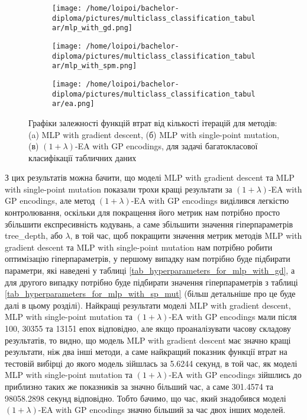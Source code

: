 \begin{figure}[ht]
	\centering
	\begin{subfigure}[b]{0.32\textwidth}    
		\texttt{[image: /home/loipoi/bachelor-diploma/pictures/multiclass\_classification\_tabular/mlp\_with\_gd.png]}
		\caption{}
	\end{subfigure}	
	\begin{subfigure}[b]{0.32\textwidth}
		\texttt{[image: /home/loipoi/bachelor-diploma/pictures/multiclass\_classification\_tabular/mlp\_with\_spm.png]}
		\caption{}
	\end{subfigure}	
	\begin{subfigure}[b]{0.32\textwidth}
		\texttt{[image: /home/loipoi/bachelor-diploma/pictures/multiclass\_classification\_tabular/ea.png]}
		\caption{}
	\end{subfigure}
	
	\caption{Графіки залежності функцій втрат від кількості ітерацій для методів: (a) MLP with gradient descent, (б) MLP with single-point mutation, (в) $(1+\lambda)$-EA with GP encodings, для задачі багатокласової класифікації табличних даних}
	\label{fig_losses_mc_td}
\end{figure}

З цих результатів можна бачити, що моделі MLP with gradient descent та MLP with single-point mutation показали трохи кращі результати за $(1+\lambda)$-EA with GP encodings, але метод $(1+\lambda)$-EA with GP encodings виділився легкістю контролювання, оскільки для покращення його метрик нам потрібно просто збільшити експресивність кодувань, а саме збільшити значення гіперпараметрів tree\_depth, або $\lambda$, в той час, щоб покращити значення метрик методів MLP with gradient descent та MLP with single-point mutation нам потрібно робити оптимізацію гіперпараметрів, у першому випадку нам потрібно буде підбирати параметри, які наведені у таблиці \ref{tab_hyperparameters_for_mlp_with_gd}, а для другого випадку потрібно буде підбирати значення гіперпараметрів з таблиці \ref{tab_hyperparameters_for_mlp_with_sp_mut} (більш детальніше про це буде далі в цьому розділі). Найкращі результати моделі MLP with gradient descent, MLP with single-point mutation та $(1+\lambda)$-EA with GP encodings мали після 100, 30355 та 13151 епох відповідно, але якщо проаналізувати часову складову результатів, то видно, що модель MLP with gradient descent має значно кращі результати, ніж два інші методи, а саме найкращий показник функції втрат на тестовій вибірці до якого модель зійшлась за 5.6244 секунд, в той час, як моделі MLP with single-point mutation та $(1+\lambda)$-EA with GP encodings зійшлись до приблизно таких же показників за значно більший час, а саме 301.4574 та 98058.2898 секунд відповідно. Тобто бачимо, що час, який знадобився моделі $(1+\lambda)$-EA with GP encodings значно більший за час двох інших моделей.

